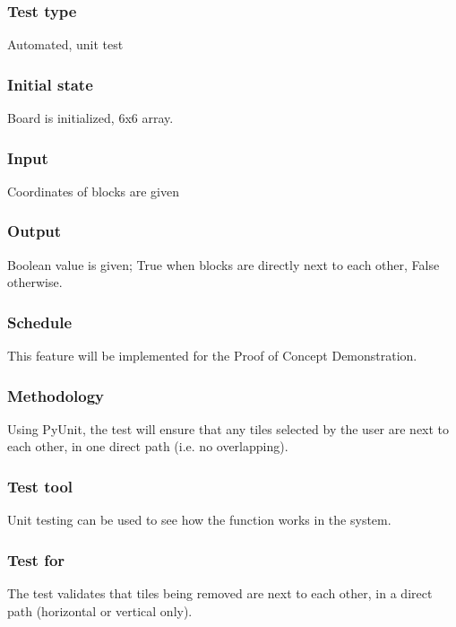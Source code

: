 \documentclass[12pt]{article}
\begin{document}
\subsubsection{Test type}
Automated, unit test
\subsubsection{Initial state}
Board is initialized, 6x6 array. 
\subsubsection{Input}
Coordinates of blocks are given
\subsubsection{Output}
Boolean value is given; True when blocks are directly next to each other, False otherwise.
\subsubsection{Schedule}
This feature will be implemented for the Proof of Concept Demonstration.
\subsubsection{Methodology}
Using PyUnit, the test will ensure that any tiles selected by the user are next to each other, in one direct path (i.e. no overlapping).
\subsubsection{Test tool}
Unit testing can be used to see how the function works in the system.
\subsubsection{Test for}
The test validates that tiles being removed are next to each other, in a direct path (horizontal or vertical only).
\end{document}
